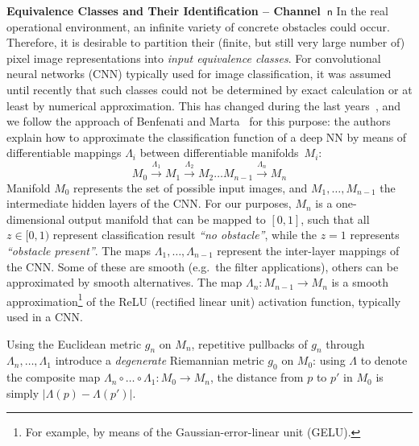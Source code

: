 \documentclass[runningheads,a4paper]{llncs}
\begin{document}
 
\noindent
{\bf Equivalence Classes and Their Identification -- Channel~$\mathsf{n}$}
In the real operational environment, an infinite variety of concrete obstacles could occur. Therefore, it is desirable
to partition their (finite, but still very large number of) pixel image representations into 
\emph{input equivalence classes}.
For convolutional neural networks (CNN) typically  used for image classification, it was assumed until recently that such classes could not be determined by exact calculation or at least by numerical approximation. This has changed during the last years~\cite{cheng_quantitative_2018,DBLP:journals/nn/BenfenatiM23,DBLP:journals/nn/BenfenatiM23a}, and we follow the approach of Benfenati and Marta~\cite{DBLP:journals/nn/BenfenatiM23,DBLP:journals/nn/BenfenatiM23a} for this purpose: the authors explain how to approximate the classification function of a deep NN by means of differentiable mappings $\Lambda_i$ between differentiable manifolds~$M_i$:
$$
    M_0 \stackrel{\Lambda_1}{\longrightarrow} M_1 \stackrel{\Lambda_2}{\longrightarrow} M_2\dots M_{n-1} \stackrel{\Lambda_n}{\longrightarrow} M_n
$$
Manifold $M_0$ represents the set of possible input images, and $M_1,\dots,M_{n-1}$ the intermediate hidden layers of the CNN.
For our purposes, $M_n$ is a one-dimensional output 
manifold that can be mapped to $[0,1]$, such that all $z\in[0,1)$ represent classification result {\sl ``no obstacle''}, while the $z=1$ represents {\sl ``obstacle present''}. 
The maps $\Lambda_1,\dots,\Lambda_{n-1}$ represent the inter-layer mappings of the CNN. Some of these are smooth (e.g.~the filter applications), others can be approximated by smooth alternatives.
The map $\Lambda_n : M_{n-1} \longrightarrow M_n$ is a smooth approximation\footnote{For example, by means of the Gaussian-error-linear unit (GELU).} of the ReLU (rectified linear unit) activation function, typically used in a CNN. 

Using the Euclidean metric $g_n$ on $M_n$, 
repetitive pullbacks of $g_n$ through $\Lambda_n,\dots,\Lambda_1$ introduce a {\it degenerate} Riemannian metric $g_0$ on $M_0$: using $\Lambda$ to denote the composite map $\Lambda_n\circ \dots\circ\Lambda_1 : M_0 \longrightarrow M_n$, 
the distance from $p$ to $p'$ in $M_0$ is simply $|\Lambda(p) - \Lambda(p')|$.
\end{document}
